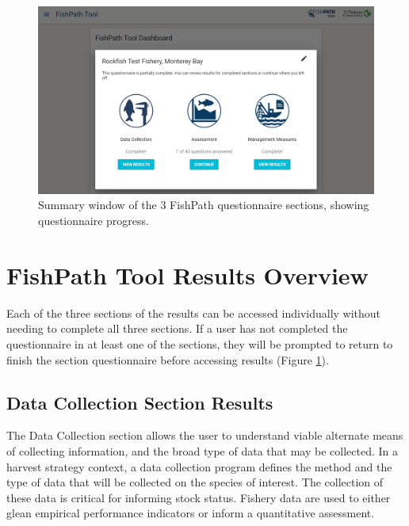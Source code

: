 \documentclass[11pt,]{book}
\begin{document}
\begin{figure}
 
 {\centering \includegraphics[width=0.95\linewidth]{images/summary-screen} 
 
 }
 
 \caption{Summary window of the 3 FishPath questionnaire sections, showing questionnaire progress.}\label{fig:summary-screen}
 \end{figure}

\hypertarget{fishpath-tool-results-overview}{%
\chapter{FishPath Tool Results Overview}\label{fishpath-tool-results-overview}}

Each of the three sections of the results can be accessed individually without needing to complete all three sections. If a user has not completed the questionnaire in at least one of the sections, they will be prompted to return to finish the section questionnaire before accessing results (Figure \ref{fig:summary-screen}).

\hypertarget{data-collection-section-results}{%
\section{Data Collection Section Results}\label{data-collection-section-results}}

The Data Collection section allows the user to understand viable alternate means of collecting information, and the broad type of data that may be collected. In a harvest strategy context, a data collection program defines the method and the type of data that will be collected on the species of interest. The collection of these data is critical for informing stock status. Fishery data are used to either glean empirical performance indicators or inform a quantitative assessment.
\end{document}
